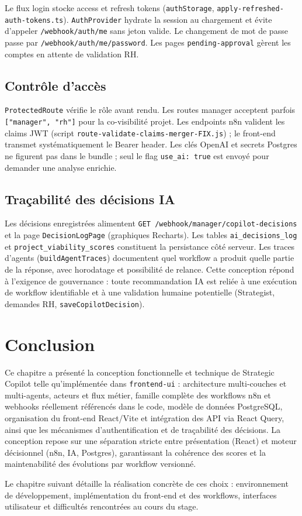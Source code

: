 Le flux login stocke access et refresh tokens (\texttt{authStorage}, \texttt{apply-refreshed-auth-tokens.ts}). \texttt{AuthProvider} hydrate la session au chargement et évite d'appeler \texttt{/webhook/auth/me} sans jeton valide. Le changement de mot de passe passe par \texttt{/webhook/auth/me/password}. Les pages \texttt{pending-approval} gèrent les comptes en attente de validation RH.

\subsection{Contrôle d'accès}

\texttt{ProtectedRoute} vérifie le rôle avant rendu. Les routes manager acceptent parfois \texttt{["manager", "rh"]} pour la co-visibilité projet. Les endpoints n8n valident les claims JWT (script \texttt{route-validate-claims-merger-FIX.js}) ; le front-end transmet systématiquement le Bearer header. Les clés OpenAI et secrets Postgres ne figurent pas dans le bundle ; seul le flag \texttt{use\_ai: true} est envoyé pour demander une analyse enrichie.

\subsection{Traçabilité des décisions IA}

Les décisions enregistrées alimentent \texttt{GET /webhook/manager/copilot-decisions} et la page \texttt{DecisionLogPage} (graphiques Recharts). Les tables \texttt{ai\_decisions\_log} et \texttt{project\_viability\_scores} constituent la persistance côté serveur. Les traces d'agents (\texttt{buildAgentTraces}) documentent quel workflow a produit quelle partie de la réponse, avec horodatage et possibilité de relance. Cette conception répond à l'exigence de gouvernance : toute recommandation IA est reliée à une exécution de workflow identifiable et à une validation humaine potentielle (Strategist, demandes RH, \texttt{saveCopilotDecision}).

\section{Conclusion}

Ce chapitre a présenté la conception fonctionnelle et technique de Strategic Copilot telle qu'implémentée dans \texttt{frontend-ui} : architecture multi-couches et multi-agents, acteurs et flux métier, famille complète des workflows n8n et webhooks réellement référencés dans le code, modèle de données PostgreSQL, organisation du front-end React/Vite et intégration des API via React Query, ainsi que les mécanismes d'authentification et de traçabilité des décisions. La conception repose sur une séparation stricte entre présentation (React) et moteur décisionnel (n8n, IA, Postgres), garantissant la cohérence des scores et la maintenabilité des évolutions par workflow versionné.

Le chapitre suivant détaille la réalisation concrète de ces choix : environnement de développement, implémentation du front-end et des workflows, interfaces utilisateur et difficultés rencontrées au cours du stage.
